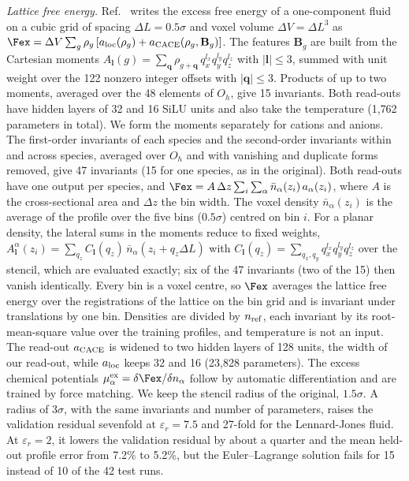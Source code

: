 \textit{Lattice free energy.} Ref.~\cite{cheng2026equivariant} writes the excess free energy of a one-component fluid on a cubic grid of spacing $\Delta L=0.5\sigma$ and voxel volume $\Delta V=\Delta L^3$ as $\Fex=\Delta V\sum_g\rho_g\,[a_{\rm loc}(\rho_g)+a_{\rm CACE}(\rho_g,\mathbf B_g)]$. The features $\mathbf B_g$ are built from the Cartesian moments $A_{\mathbf l}(g)=\sum_{\mathbf q}\rho_{g+\mathbf q}\,q_x^{l_x}q_y^{l_y}q_z^{l_z}$ with $|\mathbf l|\le3$, summed with unit weight over the 122 nonzero integer offsets with $|\mathbf q|\le3$. Products of up to two moments, averaged over the 48 elements of $O_h$, give 15 invariants. Both read-outs have hidden layers of 32 and 16 SiLU units and also take the temperature (1{,}762 parameters in total).  We form the moments separately for cations and anions. The first-order invariants of each species and the second-order invariants within and across species, averaged over $O_h$ and with vanishing and duplicate forms removed, give 47 invariants (15 for one species, as in the original). Both read-outs have one output per species, and $\Fex=A\,\Delta z\sum_i\sum_\alpha\bar n_\alpha(z_i)\,a_\alpha(z_i)$, where $A$ is the cross-sectional area and $\Delta z$ the bin width. The voxel density $\bar n_\alpha(z_i)$ is the average of the profile over the five bins ($0.5\sigma$) centred on bin $i$. For a planar density, the lateral sums in the moments reduce to fixed weights, $A^\alpha_{\mathbf l}(z_i)=\sum_{q_z}C_{\mathbf l}(q_z)\,\bar n_\alpha(z_i+q_z\Delta L)$ with $C_{\mathbf l}(q_z)=\sum_{q_x,q_y}q_x^{l_x}q_y^{l_y}q_z^{l_z}$ over the stencil, which are evaluated exactly; six of the 47 invariants (two of the 15) then vanish identically. Every bin is a voxel centre, so $\Fex$ averages the lattice free energy over the registrations of the lattice on the bin grid and is invariant under translations by one bin. Densities are divided by $n_{\rm ref}$, each invariant by its root-mean-square value over the training profiles, and temperature is not an input. The read-out $a_{\rm CACE}$ is widened to two hidden layers of 128 units, the width of our read-out, while $a_{\rm loc}$ keeps 32 and 16 (23{,}828 parameters). The excess chemical potentials $\mu^{\rm ex}_\alpha=\delta\Fex/\delta n_\alpha$ follow by automatic differentiation and are trained by force matching. We keep the stencil radius of the original, $1.5\sigma$. A radius of $3\sigma$, with the same invariants and number of parameters, raises the validation residual sevenfold at $\varepsilon_r=7.5$ and 27-fold for the Lennard-Jones fluid. At $\varepsilon_r=2$, it lowers the validation residual by about a quarter and the mean held-out profile error from 7.2\% to 5.2\%, but the Euler--Lagrange solution fails for 15 instead of 10 of the 42 test runs.

